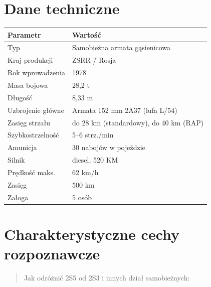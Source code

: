 \documentclass[12pt,openany,oneside]{book}
\begin{document}
\section{Dane techniczne}\label{dane-techniczne-11}

\begin{longtable}[]{@{}ll@{}}
\toprule\noalign{}
Parametr & Wartość \\
\midrule\noalign{}
\endhead
\bottomrule\noalign{}
\endlastfoot
Typ & Samobieżna armata gąsienicowa \\
Kraj produkcji & ZSRR / Rosja \\
Rok wprowadzenia & 1978 \\
Masa bojowa & 28,2 t \\
Długość & 8,33 m \\
Uzbrojenie główne & Armata 152 mm 2A37 (lufa L/54) \\
Zasięg strzału & do 28 km (standardowy), do 40 km (RAP) \\
Szybkostrzelność & 5--6 strz./min \\
Amunicja & 30 nabojów w pojeździe \\
Silnik & diesel, 520 KM \\
Prędkość maks. & 62 km/h \\
Zasięg & 500 km \\
Załoga & 5 osób \\
\end{longtable}

\section{Charakterystyczne cechy
rozpoznawcze}\label{charakterystyczne-cechy-rozpoznawcze-11}

\begin{quote}
Jak odróżnić 2S5 od 2S3 i innych dział samobieżnych:
\end{quote}
\end{document}
